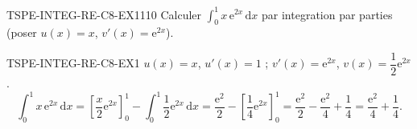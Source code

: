 

\begin{exercice}{TSPE-INTEG-RE-C8-EX1}{1}{10}
Calculer $\displaystyle\int_0^1 x\,\mathrm{e}^{2x}\,\mathrm{d}x$ par integration par parties (poser $u(x)=x$, $v'(x)=\mathrm{e}^{2x}$).
\end{exercice}


\begin{corrige}{TSPE-INTEG-RE-C8-EX1}
$u(x)=x$, $u'(x)=1$ ; $v'(x)=\mathrm{e}^{2x}$, $v(x)=\dfrac{1}{2}\mathrm{e}^{2x}$.
\[
  \int_0^1 x\,\mathrm{e}^{2x}\,\mathrm{d}x = \left[\frac{x}{2}\mathrm{e}^{2x}\right]_0^1 - \int_0^1 \frac{1}{2}\mathrm{e}^{2x}\,\mathrm{d}x = \frac{\mathrm{e}^2}{2} - \left[\frac{1}{4}\mathrm{e}^{2x}\right]_0^1 = \frac{\mathrm{e}^2}{2} - \frac{\mathrm{e}^2}{4} + \frac{1}{4} = \frac{\mathrm{e}^2}{4}+\frac{1}{4}.
\]
\end{corrige}
